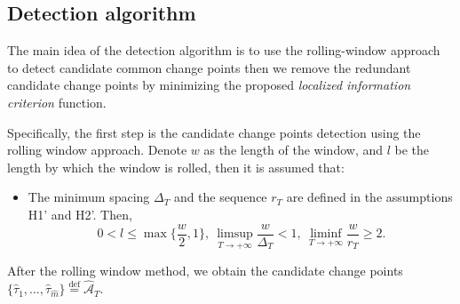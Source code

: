 \documentclass[11pt]{article}
\begin{document}
\subsection{Detection algorithm}
\label{sec:multicp-algo}
The main idea of the detection algorithm is to use the rolling-window approach to detect candidate common change points then we remove the redundant candidate change points by minimizing the proposed \emph{localized information criterion} function. 

Specifically, the first step is the candidate change points detection using the rolling window approach. Denote $w$ as the length of the window, and $l$ be the length by which the window is rolled, then it is assumed that:
\begin{itemize}
    \item[(H3')] The minimum spacing $\Delta_T$ and the sequence $r_T$ are defined in the assumptions H1' and H2'. Then,
    \begin{equation*}
        0 < l \leq \max\{\frac{w}{2}, 1\},\ \limsup_{T\to +\infty}\frac{w}{\Delta_T} < 1,\ \liminf_{T\to +\infty}\frac{w}{r_T} \geq 2.
    \end{equation*}
\end{itemize}
After the rolling window method, we obtain the candidate change points $\{\widehat{\tau}_1, \dots, \widehat{\tau}_{\widehat{m}}\} \overset{\text{def}}{=} \widehat{\mathcal{A}}_T$. 
\end{document}

